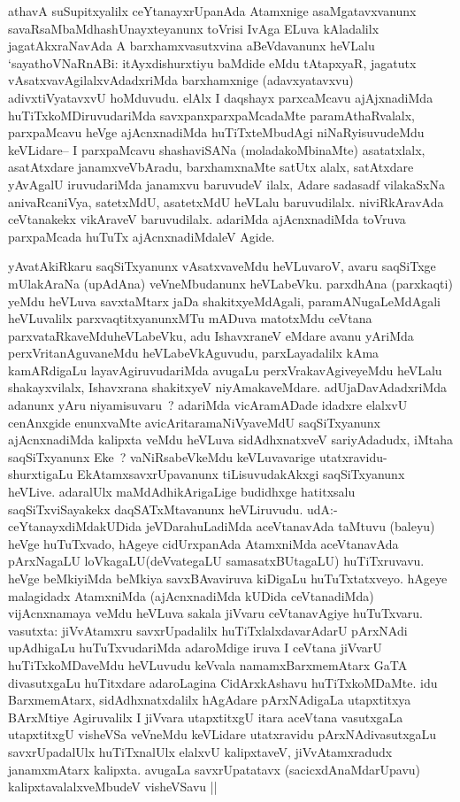 \begin{artha}
athavA suSupitxyalilx ceYtanayxrUpanAda Atamxnige asaMgatavxvanunx
savaRsaMbaMdhashUnayxteyanunx toVrisi IvAga ELuva kAladalilx
jagatAkxraNavAda A barxhamxvasutxvina aBeVdavanunx heVLalu
`sayathoVNaRnABi: \mdash itAyxdishurxtiyu baMdide eMdu tAtapxyaR,
jagatutx vAsatxvavAgilalxvAdadxriMda barxhamxnige (adavxyatavxvu)
adivxtiVyatavxvU hoMduvudu. elAlx I daqshayx parxcaMcavu ajAjxnadiMda
huTiTxkoMDiruvudariMda savxpanxparxpaMcadaMte paramAthaRvalalx,
parxpaMcavu heVge ajAcnxnadiMda huTiTxteMbudAgi niNaRyisuvudeMdu
keVLidare-- I parxpaMcavu shashaviSANa (moladakoMbinaMte) asatatxlalx,
asatAtxdare janamxveVbAradu, barxhamxnaMte satUtx alalx, satAtxdare
yAvAgalU iruvudariMda janamxvu baruvudeV ilalx, Adare sadasadf
vilakaSxNa anivaRcaniVya, satetxMdU, asatetxMdU heVLalu
baruvudilalx. niviRkAravAda ceVtanakekx vikAraveV
baruvudilalx. adariMda ajAcnxnadiMda toVruva parxpaMcada huTuTx
ajAcnxnadiMdaleV Agide.
\end{artha}

\begin{artha}
yAvatAkiRkaru saqSiTxyanunx vAsatxvaveMdu heVLuvaroV, avaru saqSiTxge
 mUlakAraNa (upAdAna) veVneMbudanunx heVLabeVku. parxdhAna
(parxkaqti) yeMdu heVLuva savxtaMtarx jaDa shakitxyeMdAgali,
paramANugaLeMdAgali heVLuvalilx parxvaqtitxyanunxMTu mADuva matotxMdu
ceVtana parxvataRkaveMduheVLabeVku, adu 	 IshavxraneV eMdare avanu
yAriMda perxVritanAguvaneMdu heVLabeVkAguvudu,  parxLayadalilx kAma
kamARdigaLu layavAgiruvudariMda avugaLu perxVrakavAgiveyeMdu heVLalu
shakayxvilalx, Ishavxrana shakitxyeV
niyAmakaveMdare. adUjaDavAdadxriMda adanunx yAru niyamisuvaru~?
adariMda vicAramADade idadxre elalxvU cenAnxgide enunxvaMte
avicAritaramaNiVyaveMdU saqSiTxyanunx ajAcnxnadiMda kalipxta veMdu
heVLuva sidAdhxnatxveV sariyAdadudx, iMtaha saqSiTxyanunx Eke~?
vaNiRsabeVkeMdu keVLuvavarige utatxravidu- shurxtigaLu
EkAtamxsavxrUpavanunx tiLisuvudakAkxgi saqSiTxyanunx
heVLive. adaralUlx maMdAdhikArigaLige budidhxge hatitxsalu
saqSiTxviSayakekx daqSATxMtavanunx heVLiruvudu. udA:-
ceYtanayxdiMdakUDida jeVDarahuLadiMda aceVtanavAda taMtuvu (baleyu) heVge
huTuTxvado, hAgeye cidUrxpanAda AtamxniMda aceVtanavAda pArxNagaLU
loVkagaLU(deVvategaLU samasatxBUtagaLU) huTiTxruvavu. heVge beMkiyiMda
beMkiya savxBAvaviruva kiDigaLu huTuTxtatxveyo. hAgeye malagidadx
AtamxniMda (ajAcnxnadiMda kUDida ceVtanadiMda) vijAcnxnamaya veMdu
heVLuva sakala jiVvaru ceVtanavAgiye huTuTxvaru. vasutxta: jiVvAtamxru
savxrUpadalilx huTiTxlalxdavarAdarU pArxNAdi upAdhigaLu
huTuTxvudariMda adaroMdige iruva I ceVtana jiVvarU huTiTxkoMDaveMdu
heVLuvudu keVvala namamxBarxmemAtarx GaTA divasutxgaLu huTitxdare
adaroLagina CidArxkAshavu huTiTxkoMDaMte. idu BarxmemAtarx,
sidAdhxnatxdalilx hAgAdare pArxNAdigaLa utapxtitxya BArxMtiye
Agiruvalilx I jiVvara utapxtitxgU itara aceVtana vasutxgaLa
utapxtitxgU visheVSa veVneMdu keVLidare utatxravidu pArxNAdivasutxgaLu
savxrUpadalUlx huTiTxnalUlx elalxvU kalipxtaveV, jiVvAtamxradudx
janamxmAtarx kalipxta. avugaLa savxrUpatatavx (sacicxdAnaMdarUpavu)
kalipxtavalalxveMbudeV visheVSavu ||
\end{artha}


